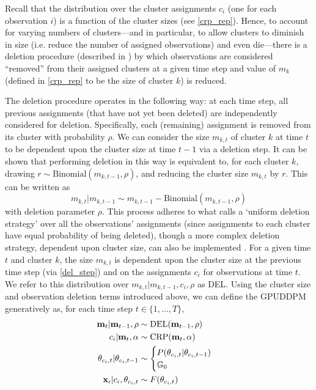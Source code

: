\documentclass[smallcondensed, final]{svjour3}
\begin{document}
Recall that the distribution over the cluster assignments $c_{i}$ (one for each observation $i$) is a function of the cluster sizes (see \eqref{crp_rep}). Hence, to account for varying numbers of clusters---and in particular, to allow clusters to diminish in size (i.e. reduce the number of assigned observations) and even die---there is a deletion procedure (described in \cite{caron_2007}) by which observations are considered ``removed'' from their assigned clusters at a given time step and value of $m_{k}$ (defined in \eqref{crp_rep} to be the size of cluster $k$) is reduced.

The deletion procedure operates in the following way: at each time step, all previous assignments (that have not yet been deleted) are independently considered for deletion. Specifically, each (remaining) assignment is removed from its cluster with probability $\rho$. We can consider the size $m_{k,t}$ of cluster $k$ at time $t$ to be dependent upon the cluster size at time $t-1$ via a deletion step. It can be shown that performing deletion in this way is equivalent to, for each cluster $k$, drawing $r \sim \text{Binomial}(m_{k,t-1}, \rho)$, and reducing the cluster size $m_{k,t}$ by $r$. This can be written as 
\begin{equation}
\label{del_step}
m_{k,t} | m_{k,t-1}   \sim   m_{k,t-1}-\text{Binomial}(m_{k,t-1}, \rho)
\end{equation}
with deletion parameter $\rho$. This process adheres to what \cite{caron_2007} calls a `uniform deletion strategy' over all the observations' assignments (since assignments to each cluster have equal probability of being deleted), though a more complex deletion strategy, dependent upon cluster size, can also be implemented \cite{caron_2007}. For a given time $t$ and cluster $k$, the size $m_{k,t}$ is dependent upon the cluster size at the previous time step (via \eqref{del_step}) and on the assignments $c_{i}$ for observations at time $t$. We refer to this distribution over $m_{k,t} | m_{k,t-1}, c_{i}, \rho$ as DEL. Using the cluster size and observation deletion terms introduced above, we can define the GPUDDPM generatively as, for each time step $t \in \{1, \ldots, T\}$,  %
\begin{align}
\begin{split}
\bold{m}_{t} | \bold{m}_{t-1}, \rho  &\sim \text{DEL}(\bold{m}_{t-1}, \rho) \\
c_{i} | \bold{m}_{t}, \alpha  &\sim  \text{CRP}(\bold{m}_{t}, \alpha) \\
\theta_{c_{i}, t} | \theta_{c_{i}, t-1}   &\sim
\begin{cases}
	P(\theta_{c_{i}, t} | \theta_{c_{i}, t-1}) \\
	\mathbb{G}_{0}
\end{cases} \\
\bold{x}_{i} | c_{i}, \theta_{c_{i}, t} &\sim F(\theta_{c_{i}, t})
\end{split}
\end{align}
\end{document}
